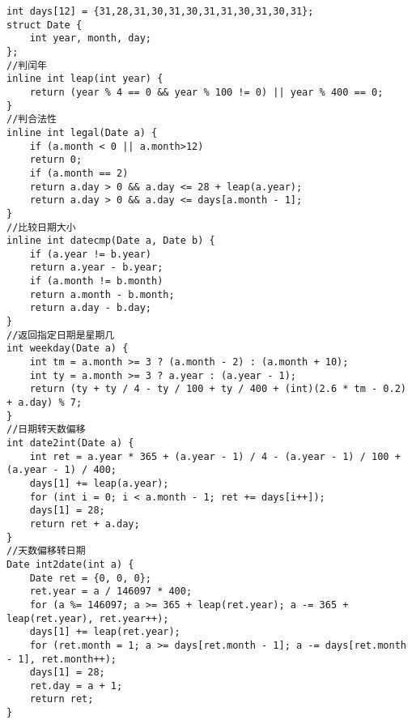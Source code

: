 \documentclass[a4paper,landscape,twocolumn]{ctexart}
\begin{document}
\begin{lstlisting}
int days[12] = {31,28,31,30,31,30,31,31,30,31,30,31};
struct Date {
	int year, month, day;
};
//判闰年	
inline int leap(int year) {
	return (year % 4 == 0 && year % 100 != 0) || year % 400 == 0;
}
//判合法性
inline int legal(Date a) {
	if (a.month < 0 || a.month>12)
	return 0;
	if (a.month == 2)
	return a.day > 0 && a.day <= 28 + leap(a.year);
	return a.day > 0 && a.day <= days[a.month - 1];
}
//比较日期大小
inline int datecmp(Date a, Date b) {
	if (a.year != b.year)
	return a.year - b.year;
	if (a.month != b.month)
	return a.month - b.month;
	return a.day - b.day;
}
//返回指定日期是星期几
int weekday(Date a) {
	int tm = a.month >= 3 ? (a.month - 2) : (a.month + 10);
	int ty = a.month >= 3 ? a.year : (a.year - 1);
	return (ty + ty / 4 - ty / 100 + ty / 400 + (int)(2.6 * tm - 0.2) + a.day) % 7;
}
//日期转天数偏移
int date2int(Date a) {
	int ret = a.year * 365 + (a.year - 1) / 4 - (a.year - 1) / 100 + (a.year - 1) / 400;
	days[1] += leap(a.year);
	for (int i = 0; i < a.month - 1; ret += days[i++]);
	days[1] = 28;
	return ret + a.day;
}
//天数偏移转日期
Date int2date(int a) {
	Date ret = {0, 0, 0};
	ret.year = a / 146097 * 400;
	for (a %= 146097; a >= 365 + leap(ret.year); a -= 365 + leap(ret.year), ret.year++);
	days[1] += leap(ret.year);
	for (ret.month = 1; a >= days[ret.month - 1]; a -= days[ret.month - 1], ret.month++);
	days[1] = 28;
	ret.day = a + 1;
	return ret;
}
\end{lstlisting}
\end{document}
